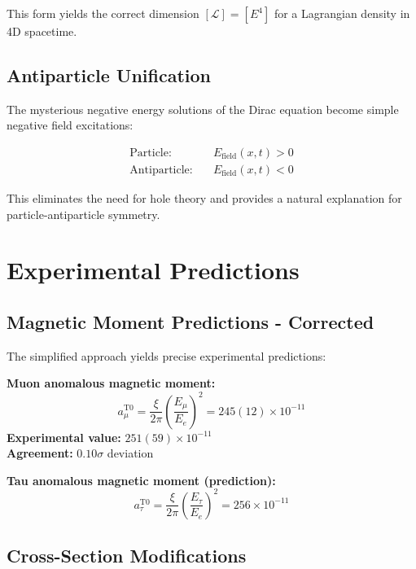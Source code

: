 \documentclass[12pt,a4paper]{report}
\begin{document}
This form yields the correct dimension $[\mathcal{L}] = [E^4]$ for a Lagrangian density in 4D spacetime.
\subsection{Antiparticle Unification}
\label{subsec:antiparticle_unification}

The mysterious negative energy solutions of the Dirac equation become simple negative field excitations:

\begin{align}
	\text{Particle:} \quad &E_{\text{field}}(x,t) > 0 \\
	\text{Antiparticle:} \quad &E_{\text{field}}(x,t) < 0
\end{align}

This eliminates the need for hole theory and provides a natural explanation for particle-antiparticle symmetry.

\section{Experimental Predictions}
\label{sec:experimental_predictions}

\subsection{Magnetic Moment Predictions - Corrected}
\label{subsec:magnetic_moment_predictions}

The simplified approach yields precise experimental predictions:

\textbf{Muon anomalous magnetic moment:}
\begin{equation}
	a_\mu^{\text{T0}} = \frac{\xi}{2\pi} \left(\frac{E_\mu}{E_e}\right)^2 = 245(12) \times 10^{-11}
\end{equation}
\textbf{Experimental value:} $251(59) \times 10^{-11}$ \\
\textbf{Agreement:} $0.10\sigma$ deviation

\textbf{Tau anomalous magnetic moment (prediction):}
\begin{equation}
	a_\tau^{\text{T0}} = \frac{\xi}{2\pi} \left(\frac{E_\tau}{E_e}\right)^2 = 256 \times 10^{-11}
\end{equation}

\subsection{Cross-Section Modifications}
\label{subsec:cross_section_modifications}
\end{document}
